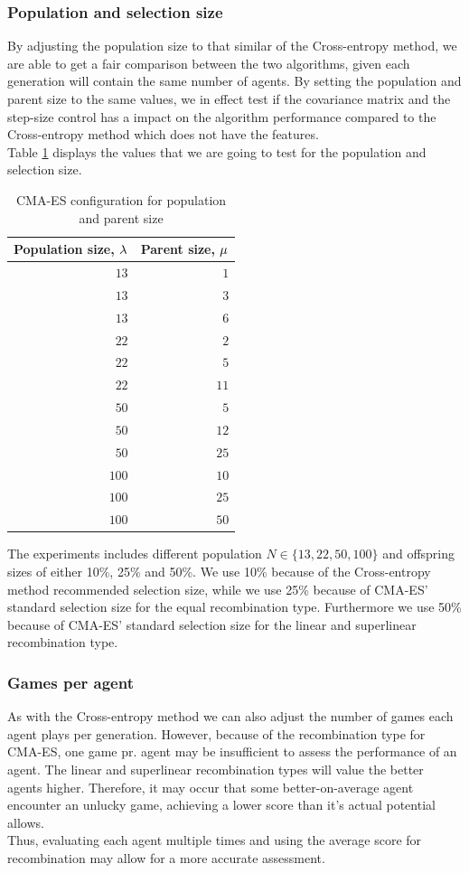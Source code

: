 \subsubsection{Population and selection size}
By adjusting the population size to that similar of the Cross-entropy method, we are able
to get a fair comparison between the two algorithms, given each generation will
contain the same number of agents. By setting the population and parent size
to the same values, we in effect test if the covariance matrix and the step-size
control has a impact on the algorithm performance compared to the Cross-entropy method
which does not have the features.\\
Table \ref{CMAPopulationSelectionConfigTest} displays the values that we are going
to test for the population and selection size.


\begin{table}[H]
\centering
\begin{tabular}{r r}
Population size, $\lambda$ & Parent size, $\mu$\\
\hline
$13$ & $1$\\
$13$ & $3$\\
$13$ & $6$\\
$22$ & $2$\\
$22$ & $5$\\
$22$ & $11$\\
$50$ & $5$\\
$50$ & $12$\\
$50$ & $25$\\
$100$ & $10$\\
$100$ & $25$\\
$100$ & $50$
\end{tabular}
\caption{CMA-ES configuration for population and parent size \label{CMAPopulationSelectionConfigTest}}
\end{table}

The experiments includes different population $N \in \{13,22,50,100\}$ and offspring sizes of either
10\%, 25\% and 50\%. We use 10\% because of the Cross-entropy method recommended selection size, while
we use 25\% because of CMA-ES' standard selection size for the equal recombination type. 
Furthermore we use 50\% because of CMA-ES' standard selection size for the linear and superlinear 
recombination type.

\subsubsection{Games per agent \label{CMAGamesPerAgentSection}}
As with the Cross-entropy method we can also adjust the number of games each agent plays per generation.
However, because of the recombination type for CMA-ES, one game pr. agent may  be insufficient to assess the
performance of an agent. The linear and superlinear recombination types will value the better agents higher.
Therefore, it may occur that some better-on-average agent encounter an unlucky game, achieving a lower score than
it's actual potential allows. \\
Thus, evaluating each agent multiple times and using the average score for recombination may allow for a more accurate assessment.\\

